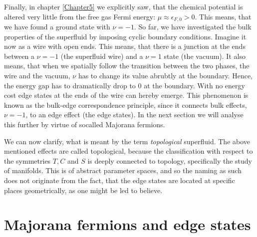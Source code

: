 Finally, in chapter \ref{Chapter5} we explicitly saw, that the chemical potential is altered very little from the free gas Fermi energy: $\mu \approx \epsilon_{F,0} > 0$. This means, that we have found a ground state with $\nu = -1$. So far, we have investigated the bulk properties of the superfluid by imposing cyclic boundary conditions. Imagine it now as a wire with open ends. This means, that there is a junction at the ends between a $\nu = -1$ (the superfluid wire) and a $\nu = 1$ state (the vacuum). It also means, that when we spatially follow the transition between the two phases, the wire and the vacuum, $\nu$ has to change its value abrubtly at the boundary. Hence, the energy gap has to dramatically drop to $0$ at the boundary. With no energy cost edge states at the ends of the wire can hereby emerge. This phenomenon is known as the bulk-edge correspondence principle, since it connects bulk effects, $\nu = -1$, to an edge effect (the edge states). In the next section we will analyse this further by virtue of socalled Majorana fermions. 

We can now clarify, what is meant by the term \textit{topological} superfluid. The above mentioned effects are called topological, because the classification with respect to the symmetries $T,C$ and $S$ is deeply connected to topology, specifically the study of manifolds. This is of abstract parameter spaces, and so the naming as such does not originate from the fact, that the edge states are located at specific places geometrically, as one might be led to believe. 

\section{Majorana fermions and edge states}




